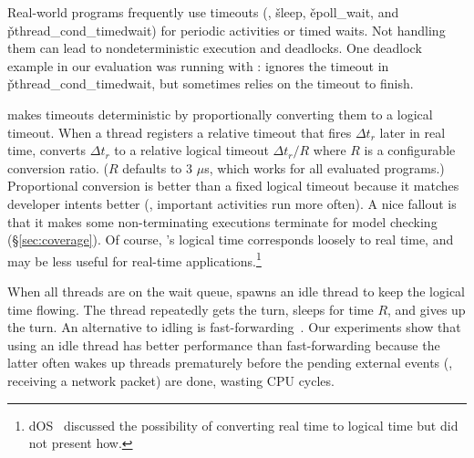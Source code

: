 Real-world programs frequently use timeouts (\eg, \v{sleep},
\v{epoll\_wait}, and \v{pthread\_cond\_timedwait}) for periodic activities
or timed waits.  Not handling them can lead to nondeterministic execution and
deadlocks.  One deadlock example in our evaluation was running \pbzip with
\dthreads: \dthreads ignores the timeout in
\v{pthread\_cond\_timedwait}, but \pbzip sometimes relies on the timeout to finish.

\xxx makes timeouts deterministic by proportionally converting them to a
logical timeout.  When a thread registers a relative timeout that fires
$\Delta t_r$ later in real time, \xxx converts $\Delta t_r$ to a relative
logical timeout $\Delta t_r /R$ where $R$ is a configurable conversion
ratio. ($R$ defaults to 3 $\mu$s, which works for all evaluated programs.)
Proportional conversion is better than a fixed logical timeout because it
matches developer intents better (\eg, important activities
run more often).  A nice fallout is that it makes some
non-terminating executions terminate for model checking
(\S\ref{sec:coverage}).  Of course, \xxx's logical time corresponds
loosely to real time, and may be less useful for real-time applications.\footnote{
dOS~\cite{dos:osdi10} discussed the possibility of converting real time to
logical time but did not present how.}


When all threads are on the wait queue, \xxx spawns an idle thread to keep the
logical time flowing. The thread repeatedly gets the turn, sleeps for time
$R$, and gives up the turn.  An alternative to idling is
fast-forwarding~\cite{modist:nsdi09,dos:osdi10}.  Our experiments show
that using an idle thread has better performance than fast-forwarding
because the latter often wakes up threads prematurely before the pending
external events (\eg, receiving a network packet) are done, wasting CPU cycles.

